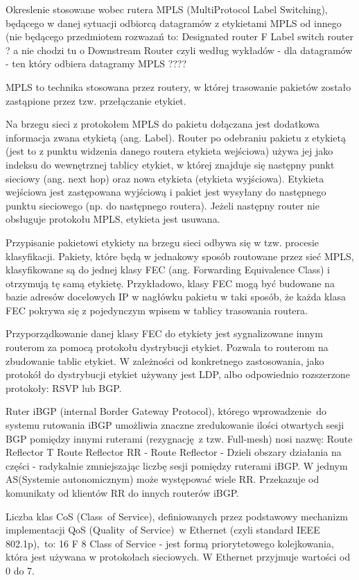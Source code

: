 \answer
{Okreslenie stosowane wobec rutera MPLS (MultiProtocol Label Switching), będącego w danej sytuacji odbiorcą datagramów z etykietami MPLS od innego (nie będącego przedmiotem rozwazań to:}
{ Designated router}
{F} %
{Label switch router ? a nie chodzi tu o Downstream Router czyli według wykładów - dla datagramów - ten który odbiera datagramy MPLS ????}
{MPLS to technika stosowana przez routery, w której trasowanie pakietów zostało zastąpione przez tzw. przełączanie etykiet.

Na brzegu sieci z protokołem MPLS do pakietu dołączana jest dodatkowa informacja zwana etykietą (ang. Label). Router po odebraniu pakietu z etykietą (jest to z punktu widzenia danego routera etykieta wejściowa) używa jej jako indeksu do wewnętrznej tablicy etykiet, w której znajduje się następny punkt sieciowy (ang. next hop) oraz nowa etykieta (etykieta wyjściowa). Etykieta wejściowa jest zastępowana wyjściową i pakiet jest wysyłany do następnego punktu sieciowego (np. do następnego routera). Jeżeli następny router nie obsługuje protokołu MPLS, etykieta jest usuwana.

Przypisanie pakietowi etykiety na brzegu sieci odbywa się w tzw. procesie klasyfikacji. Pakiety, które będą w jednakowy sposób routowane przez sieć MPLS, klasyfikowane są do jednej klasy FEC (ang. Forwarding Equivalence Class) i otrzymują tę samą etykietę. Przykładowo, klasy FEC mogą być budowane na bazie adresów docelowych IP w nagłówku pakietu w taki sposób, że każda klasa FEC pokrywa się z pojedynczym wpisem w tablicy trasowania routera.

Przyporządkowanie danej klasy FEC do etykiety jest sygnalizowane innym routerom za pomocą protokołu dystrybucji etykiet. Pozwala to routerom na zbudowanie tablic etykiet. W zależności od konkretnego zastosowania, jako protokół do dystrybucji etykiet używany jest LDP, albo odpowiednio rozszerzone protokoły: RSVP lub BGP.}

\answer
{Ruter iBGP (internal Border Gateway Protocol), którego wprowadzenie~do systemu rutowania iBGP umożliwia znaczne zredukowanie ilości otwartych sesji BGP pomiędzy innymi ruterami (rezygnację~z tzw. Full-mesh) nosi nazwę:}
{Route Reflector}
{T}
{Route Reflector}
{RR - Route Reflector - Dzieli obszary działania na części - radykalnie zmniejszając liczbę sesji pomiędzy ruterami iBGP. W jednym AS(Systemie autonomicznym) może występować wiele RR. Przekazuje od komunikaty od klientów RR do innych routerów iBGP.}

\answer
{Liczba klas CoS (Class~of Service), definiowanych przez podstawowy mechanizm implementacji QoS (Quality~of Service)~w Ethernet (czyli standard IEEE 802.1p),~to:}
{16}
{F}
{8}
{Class of Service - jest formą priorytetowego kolejkowania, która jest używana w protokołach sieciowych. W Ethernet przyjmuje wartości od 0 do 7.}

